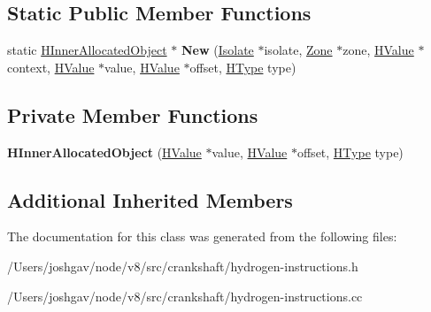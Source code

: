\subsection*{Static Public Member Functions}
\begin{DoxyCompactItemize}
\item 
static \hyperlink{classv8_1_1internal_1_1_h_inner_allocated_object}{H\+Inner\+Allocated\+Object} $\ast$ {\bfseries New} (\hyperlink{classv8_1_1internal_1_1_isolate}{Isolate} $\ast$isolate, \hyperlink{classv8_1_1internal_1_1_zone}{Zone} $\ast$zone, \hyperlink{classv8_1_1internal_1_1_h_value}{H\+Value} $\ast$context, \hyperlink{classv8_1_1internal_1_1_h_value}{H\+Value} $\ast$value, \hyperlink{classv8_1_1internal_1_1_h_value}{H\+Value} $\ast$offset, \hyperlink{classv8_1_1internal_1_1_h_type}{H\+Type} type)\hypertarget{classv8_1_1internal_1_1_h_inner_allocated_object_a4a9250f055c362a8449dd4961b7cbe93}{}\label{classv8_1_1internal_1_1_h_inner_allocated_object_a4a9250f055c362a8449dd4961b7cbe93}

\end{DoxyCompactItemize}
\subsection*{Private Member Functions}
\begin{DoxyCompactItemize}
\item 
{\bfseries H\+Inner\+Allocated\+Object} (\hyperlink{classv8_1_1internal_1_1_h_value}{H\+Value} $\ast$value, \hyperlink{classv8_1_1internal_1_1_h_value}{H\+Value} $\ast$offset, \hyperlink{classv8_1_1internal_1_1_h_type}{H\+Type} type)\hypertarget{classv8_1_1internal_1_1_h_inner_allocated_object_ad9214d2a9ea9ab0851ab4628f80bf003}{}\label{classv8_1_1internal_1_1_h_inner_allocated_object_ad9214d2a9ea9ab0851ab4628f80bf003}

\end{DoxyCompactItemize}
\subsection*{Additional Inherited Members}


The documentation for this class was generated from the following files\+:\begin{DoxyCompactItemize}
\item 
/\+Users/joshgav/node/v8/src/crankshaft/hydrogen-\/instructions.\+h\item 
/\+Users/joshgav/node/v8/src/crankshaft/hydrogen-\/instructions.\+cc\end{DoxyCompactItemize}
